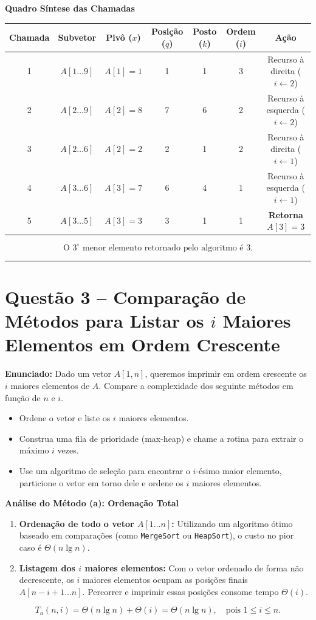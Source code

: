 \documentclass[11pt,a4paper]{article}
\newcommand{\res}[1]{\[\boxed{#1}\]}
\newcommand{\topico}[1]{\par\medskip\textbf{\color{azul}#1}\par}
\newcommand{\questao}[2]{\section*{Questão #1 -- #2}}
\begin{document}
\topico{Quadro Síntese das Chamadas}
\begin{center}
\small
\setlength{\tabcolsep}{4.5pt}
\begin{tabular}{ccccccc}
\toprule
\textbf{Chamada} & \textbf{Subvetor} & \textbf{Pivô ($x$)} & \textbf{Posição ($q$)} & \textbf{Posto ($k$)} & \textbf{Ordem ($i$)} & \textbf{Ação} \\ \midrule
1 & $A[1 \dots 9]$ & $A[1]=1$ & 1 & 1 & 3 & Recurso à direita ($i \leftarrow 2$) \\
2 & $A[2 \dots 9]$ & $A[2]=8$ & 7 & 6 & 2 & Recurso à esquerda ($i \leftarrow 2$) \\
3 & $A[2 \dots 6]$ & $A[2]=2$ & 2 & 1 & 2 & Recurso à direita ($i \leftarrow 1$) \\
4 & $A[3 \dots 6]$ & $A[3]=7$ & 6 & 4 & 1 & Recurso à esquerda ($i \leftarrow 1$) \\
5 & $A[3 \dots 5]$ & $A[3]=3$ & 3 & 1 & 1 & \textbf{Retorna $A[3] = 3$} \\
\bottomrule
\end{tabular}
\end{center}

\res{\text{O } 3^\circ \text{ menor elemento retornado pelo algoritmo é } 3.}

\vspace{12pt}
\hrule
\vspace{6pt}
\questao{3}{Comparação de Métodos para Listar os $i$ Maiores Elementos em Ordem Crescente}

\textbf{Enunciado:} Dado um vetor $A[1, n]$, queremos imprimir em ordem crescente os $i$ maiores elementos de $A$. Compare a complexidade dos seguinte métodos em função de $n$ e $i$.
\begin{itemize}
    \item[(a)] Ordene o vetor e liste os $i$ maiores elementos.
    \item[(b)] Construa uma fila de prioridade (max-heap) e chame a rotina para extrair o máximo $i$ vezes.
    \item[(c)] Use um algoritmo de seleção para encontrar o $i$-ésimo maior elemento, particione o vetor em torno dele e ordene os $i$ maiores elementos.
\end{itemize}

\topico{Análise do Método (a): Ordenação Total}
\begin{enumerate}
    \item \textbf{Ordenação de todo o vetor $A[1 \dots n]$:} Utilizando um algoritmo ótimo baseado em comparações (como \texttt{MergeSort} ou \texttt{HeapSort}), o custo no pior caso é $\Theta(n \lg n)$.
    \item \textbf{Listagem dos $i$ maiores elementos:} Com o vetor ordenado de forma não decrescente, os $i$ maiores elementos ocupam as posições finais $A[n - i + 1 \dots n]$. Percorrer e imprimir essas posições consome tempo $\Theta(i)$.
\end{enumerate}
\[
T_a(n, i) = \Theta(n \lg n) + \Theta(i) = \Theta(n \lg n), \quad \text{pois } 1 \le i \le n.
\]
\end{document}
